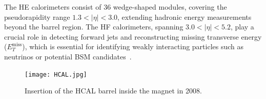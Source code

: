 The HE calorimeters consist of 36 wedge-shaped modules, covering the pseudorapidity range \(1.3 < |\eta| < 3.0\), extending hadronic energy measurements beyond the barrel region. The HF calorimeters, spanning \(3.0 < |\eta| < 5.2\), play a crucial role in detecting forward jets and reconstructing missing transverse energy (\(E_T^{\text{miss}}\)), which is essential for identifying weakly interacting particles such as neutrinos or potential BSM candidates~\cite{CMS-Trigger-Performance}.

\begin{figure}[!hbt]
    \begin{center}
        \texttt{[image: HCAL.jpg]}
        \caption{Insertion of the HCAL barrel inside the magnet in 2008.}
        \label{fig:HCAL}
    \end{center}
\end{figure}





